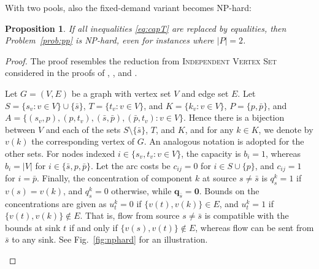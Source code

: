\documentclass[pdflatex,sn-mathphys-num]{sn-jnl}%
\theoremstyle{thmstyleone}%
\newtheorem{proposition}[theorem]{Proposition}%
\begin{document}
With two pools, also the fixed-demand variant becomes NP-hard:
\begin{proposition} \label{prop:grothey2}
If all inequalities \eqref{eq:capT} are replaced by equalities, then Problem~\ref{prob:pp} is NP-hard, even for instances where $|P|=2$. 
\end{proposition}
\begin{proof}
The proof resembles the reduction from \textsc{Independent Vertex Set} considered in the proofs of \cite[Proposition 1]{alfaki13a},
\cite[Proposition 2.1]{gupte17}, and \cite[Proposition 3]{dey15}.

Let $G=(V,E)$ be a graph with vertex set $V$ and edge set $E$.
Let $S=\{s_v: v\in V\}\cup\{\bar{s}\}$, $T=\{t_v: v\in V\}$, and $K=\{k_v: v\in V\}$, $P=\{p,\bar{p}\}$,
and $A=\{(s_v,p), (p,t_v), (\bar{s},\bar{p}), (\bar{p},t_v): v\in V\}$.
Hence there is a bijection between $V$ and each of the sets $S\setminus\{\bar{s}\}$, $T$, and $K$,
and for any $k\in K$, we denote by $v(k)$ the corresponding vertex of $G$.
An analogous notation is adopted for the other sets.
For nodes indexed $i\in\{s_v, t_v: v\in V\}$, the capacity is $b_i=1$, whereas $b_i=|V|$ for $i\in\{\bar{s},p,\bar{p}\}$.
Let the arc costs be $c_{ij}=0$ for $i\in S\cup\{p\}$, and $c_{ij}=1$ for $i=\bar{p}$.
Finally, the concentration of component $k$ at source $s\neq \bar{s}$ is $q_s^k=1$ if $v(s)=v(k)$, and $q_s^k=0$ otherwise,
while $\boldsymbol{q}_{\bar{s}}=\boldsymbol{0}$.
Bounds on the concentrations are given as $u_t^k=0$ if $\{v(t),v(k)\}\in E$, and $u_t^k=1$ if $\{v(t),v(k)\}\notin E$.
That is, flow from source $s\neq\bar{s}$ is compatible with the bounds at sink $t$ if and only if $\{v(s),v(t)\}\notin E$,
whereas flow can be sent from $\bar{s}$ to any sink.
See Fig.~\ref{fig:nphard} for an illustration.

\begin{figure}
\centering
\begin{subfigure}{0.48\textwidth}
\hspace{1em}
\end{subfigure}
\end{figure}
\end{proof}
\end{document}
